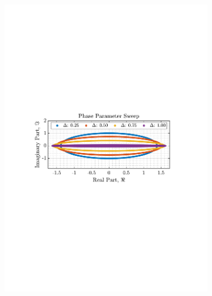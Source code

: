 \documentclass[12pt]{article}
\begin{document}
\begin{figure}[H]
				\begin{subfigure}{0.49\textwidth}
					\centering
					\includegraphics[trim={2.2cm 11.2cm 3.00cm  11.2cm}, clip, width=\textwidth]{../MATLAB/figures/q3_1c_fig03.pdf} 
					\captionsetup{justification=centering}
				\end{subfigure}
				\begin{subfigure}{0.49\textwidth}
					\centering

\end{subfigure}
\end{figure}
\end{document}
